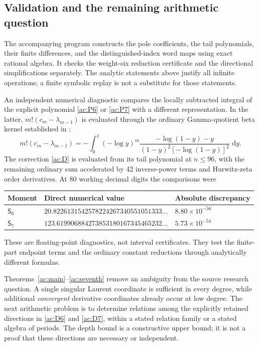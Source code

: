 \documentclass[11pt,a4paper]{article}
\numberwithin{equation}{section}
\theoremstyle{definition}
\theoremstyle{remark}
\newcommand{\dd}{\,\mathrm d}
\begin{document}
\subsection{Validation and the remaining arithmetic question}

The accompanying program constructs the pole coefficients, the
tail polynomials, their finite differences, and the distinguished-index
word maps using exact rational algebra. It checks the weight-six
reduction certificate and the directional simplifications separately.
The analytic statements above justify all infinite operations; a
finite symbolic replay is not a substitute for those statements.

An independent numerical diagnostic compares the locally subtracted
integral of the explicit polynomial \eqref{ac:P6} or
\eqref{ac:P7} with a different representation. In the latter,
$m!(c_m-\lambda_{m-1})$ is evaluated through the ordinary
Gamma-quotient beta kernel established in \cite{Fifth}:
\begin{equation}\label{ac:diagnostic-kernel}
 m!(c_m-\lambda_{m-1})
 =-\int_0^1(-\log y)^m
  \frac{-\log(1-y)-y}{(1-y)^2[-\log(1-y)]^2}\,\dd y.
\end{equation}
The correction \eqref{ac:D} is evaluated from its tail polynomial
at $n\le96$, with the remaining ordinary sum accelerated by
42 inverse-power terms and Hurwitz-zeta order derivatives.
At 80 working decimal digits the comparisons were
\begin{center}
\small
\begin{tabular}{lll}
\hline
Moment & Direct numerical value & Absolute discrepancy\\
\hline
$\mathsf S_6$ & $20.8226131542578224267340551051333\ldots$
 & $8.80\times10^{-56}$\\
$\mathsf S_7$ & $123.619906884273853180167345465232\ldots$
 & $5.73\times10^{-54}$\\
\hline
\end{tabular}
\end{center}
These are floating-point diagnostics, not interval certificates.
They test the finite-part endpoint terms and the ordinary constant
reductions through analytically different formulas.

Theorems~\ref{ac:main}--\ref{ac:seventh} remove an ambiguity from
the source research question. A single singular Laurent coordinate
is sufficient in every degree, while additional \emph{convergent}
derivative coordinates already occur at low degree. The next
arithmetic problem is to determine relations among the explicitly
retained directions in \eqref{ac:D6} and \eqref{ac:D7}, within a
stated relation family or a stated algebra of periods. The depth
bound is a constructive upper bound; it is not a proof that these
directions are necessary or independent.
\end{document}
